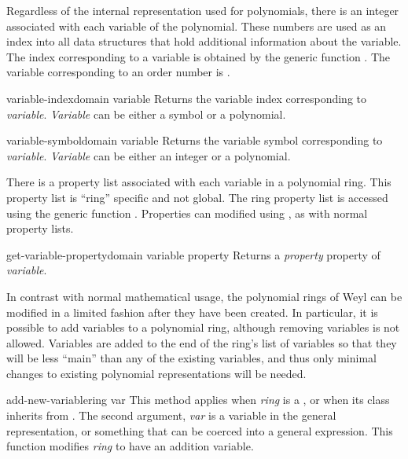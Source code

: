 Regardless of the internal representation used for polynomials, there
is an integer associated with each variable of the polynomial.  These
numbers are used as an index into all data structures that hold
additional information about the variable.  The index corresponding to
a variable is obtained by the generic function .
The variable corresponding to an order number is .

\begin{functiondef}{variable-index}{domain variable}
Returns the variable index corresponding to {\em variable}.  {\em
Variable} can be either a symbol or a polynomial.
\end{functiondef}

\begin{functiondef}{variable-symbol}{domain variable}
Returns the variable symbol corresponding to {\em variable\/}.  {\em
Variable} can be either an integer or a polynomial.
\end{functiondef}

There is a property list associated with each variable in a polynomial
ring.  This property list is ``ring'' specific and not global.  The
ring property list is accessed using the generic function
.  Properties can modified using
, as with normal property lists.

\begin{functiondef}{get-variable-property}{domain variable property}
Returns a {\em property} property of {\em variable\/}.
\end{functiondef}

In contrast with normal mathematical usage, the polynomial rings of
Weyl can be modified in a limited fashion after they have been
created.  In particular, it is possible to add variables to a
polynomial ring, although removing variables is not allowed.  Variables
are added to the end of the ring's list of variables so that they
will be less ``main'' than any of the existing variables, and thus only
minimal changes to existing polynomial representations will be needed.

\begin{methoddef}{add-new-variable}{ring var}
This method applies when {\em ring} is a , or when its
class inherits from .
The second argument, {\em var} is a variable in the general
representation, or something that can be coerced into a general
expression.  This function 
modifies {\em ring} to have an addition variable.
\end{methoddef}

